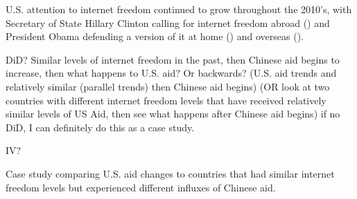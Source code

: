  U.S. attention to internet freedom continued to grow throughout the 2010's, with Secretary of State Hillary Clinton calling for internet freedom abroad (\cite{government2010}) and President Obama defending a version of it at home (\cite{government2016}) and overseas (\cite{richburg2009}).
 
 DiD? Similar levels of internet freedom in the past, then Chinese aid begins to increase, then what happens to U.S. aid? Or backwards? (U.S. aid trends and relatively similar (parallel trends) then Chinese aid begins) (OR look at two countries with different internet freedom levels that have received relatively similar levels of US Aid, then see what happens after Chinese aid begins) if no DiD, I can definitely do this as a case study.
 
 IV?

Case study comparing U.S. aid changes to countries that had similar internet freedom levels but experienced different influxes of Chinese aid.